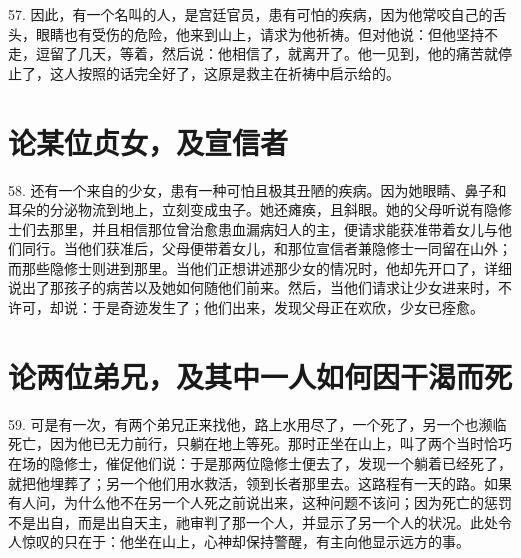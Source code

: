 57. 因此，有一个名叫的人，是宫廷官员，患有可怕的疾病，因为他常咬自己的舌头，眼睛也有受伤的危险，他来到山上，请求为他祈祷。但对他说：但他坚持不走，逗留了几天，等着，然后说：他相信了，就离开了。他一见到，他的痛苦就停止了，这人按照的话完全好了，这原是救主在祈祷中启示给的。\par


\section{论某位贞女，及宣信者}

58. 还有一个来自的少女，患有一种可怕且极其丑陋的疾病。因为她眼睛、鼻子和耳朵的分泌物流到地上，立刻变成虫子。她还瘫痪，且斜眼。她的父母听说有隐修士们去那里，并且相信那位曾治愈患血漏病妇人的主，便请求能获准带着女儿与他们同行。当他们获准后，父母便带着女儿，和那位宣信者兼隐修士一同留在山外；而那些隐修士则进到那里。当他们正想讲述那少女的情况时，他却先开口了，详细说出了那孩子的病苦以及她如何随他们前来。然后，当他们请求让少女进来时，不许可，却说：于是奇迹发生了；他们出来，发现父母正在欢欣，少女已痊愈。\par


\section{论两位弟兄，及其中一人如何因干渴而死}

59. 可是有一次，有两个弟兄正来找他，路上水用尽了，一个死了，另一个也濒临死亡，因为他已无力前行，只躺在地上等死。那时正坐在山上，叫了两个当时恰巧在场的隐修士，催促他们说：于是那两位隐修士便去了，发现一个躺着已经死了，就把他埋葬了；另一个他们用水救活，领到长者那里去。这路程有一天的路。如果有人问，为什么他不在另一个人死之前说出来，这种问题不该问；因为死亡的惩罚不是出自，而是出自天主，祂审判了那一个人，并显示了另一个人的状况。此处令人惊叹的只在于：他坐在山上，心神却保持警醒，有主向他显示远方的事。\par

